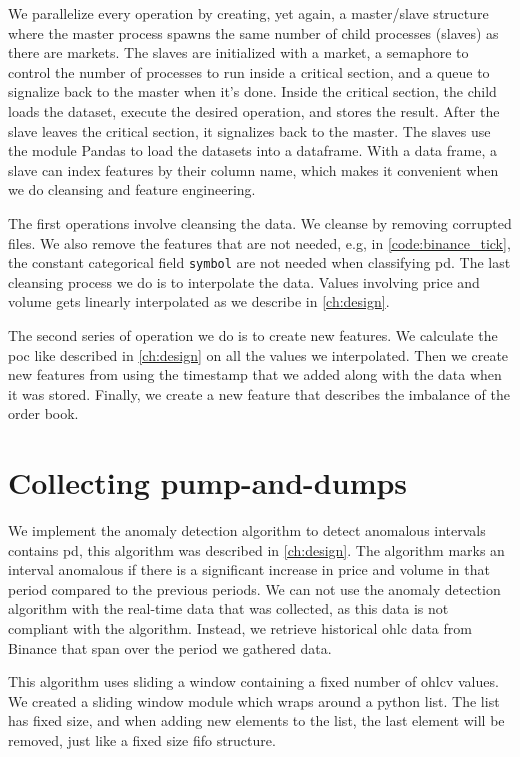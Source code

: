 We parallelize every operation by creating, yet again, a master/slave structure where the master process spawns the same number of child processes (slaves) as there are markets. The slaves are initialized with a market, a semaphore to control the number of processes to run inside a critical section, and a queue to signalize back to the master when it's done. Inside the critical section, the child loads the dataset, execute the desired operation, and stores the result. After the slave leaves the critical section, it signalizes back to the master. The slaves use the module Pandas to load the datasets into a dataframe. With a data frame, a slave can index features by their column name, which makes it convenient when we do cleansing and feature engineering. 

The first operations involve cleansing the data. We cleanse by removing corrupted files. We also remove the features that are not needed, e.g, in \autoref{code:binance_tick}, the constant categorical field \texttt{symbol} are not needed when classifying \ac{pd}. The last cleansing process we do is to interpolate the data. Values involving price and volume gets linearly interpolated as we describe in \autoref{ch:design}.

The second series of operation we do is to create new features. We calculate the \ac{poc} like described in \autoref{ch:design} on all the values we interpolated. Then we create new features from using the timestamp that we added along with the data when it was stored. Finally, we create a new feature that describes the imbalance of the order book.

\section{Collecting pump-and-dumps}
We implement the anomaly detection algorithm to detect anomalous intervals contains \ac{pd}, this algorithm was described in \autoref{ch:design}. The algorithm marks an interval anomalous if there is a significant increase in price and volume in that period compared to the previous periods. We can not use the anomaly detection algorithm with the real-time data that was collected, as this data is not compliant with the algorithm. Instead, we retrieve historical \ac{ohlc} data from Binance that span over the period we gathered data.

This algorithm uses sliding a window containing a fixed number of \ac{ohlcv} values. We created a sliding window module which wraps around a python list. The list has fixed size, and when adding new elements to the list, the last element will be removed, just like a fixed size \ac{fifo} structure.

